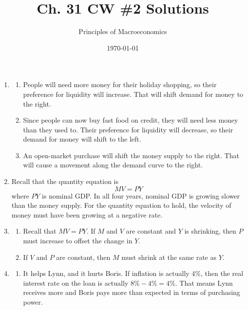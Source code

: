 \documentclass{article}
\title{Ch. 31 CW \#2 Solutions}
\author{Principles of Macroeconomics}
\date{\today}
\begin{document}
\maketitle

\begin{enumerate}

\item 

	\begin{enumerate}
	
	\item People will need more money for their holiday shopping, so their preference for liquidity will increase. That will shift demand for money to the right.
	
	\item Since people can now buy fast food on credit, they will need less money than they used to. Their preference for liquidity will decrease, so their demand for money will shift to the left.
	
	\item An open-market purchase will shift the money supply to the right. That will cause a movement along the demand curve to the right.
	
	\end{enumerate}
	
\item Recall that the quantity equation is \[MV = PY\] where $PY$ is nominal GDP. In all four years, nominal GDP is growing slower than the money supply. For the quantity equation to hold, the velocity of money must have been growing at a negative rate.

\item

	\begin{enumerate}
	
	\item Recall that $MV = PY$. If $M$ and $V$ are constant and $Y$ is shrinking, then $P$ must increase to offset the change in $Y$. 
	
	\item If $V$ and $P$ are constant, then $M$ must shrink at the same rate as $Y$.
	
	\end{enumerate}
	
\item

	\begin{enumerate}
	
	\item It helps Lynn, and it hurts Boris. If inflation is actually 4\%, then the real interest rate on the loan is actually $8\% - 4\% = 4\%$. That means Lynn receives more and Boris pays more than expected in terms of purchasing power.
	

\end{enumerate}
\end{enumerate}
\end{document}
